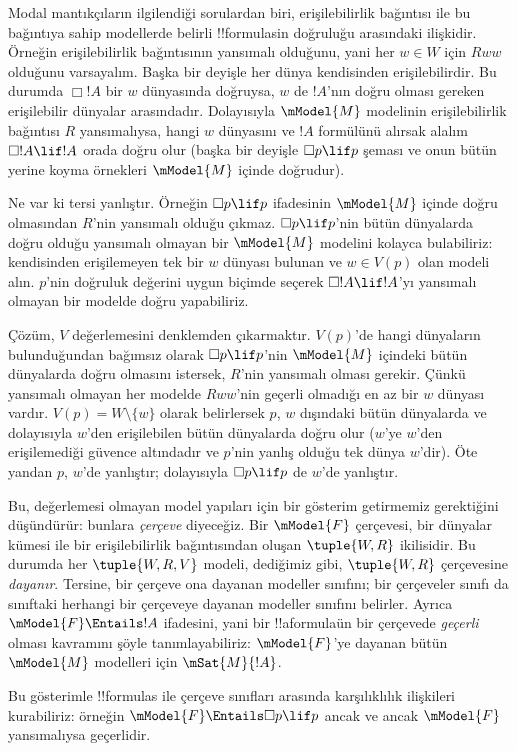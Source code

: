 \documentclass[../../../include/open-logic-section]{subfiles}
\begin{document}


Modal mantıkçıların ilgilendiği sorulardan biri, erişilebilirlik bağıntısı ile
bu bağıntıya sahip modellerde belirli !!{formula}s{}in doğruluğu arasındaki
ilişkidir. Örneğin erişilebilirlik bağıntısının yansımalı olduğunu, yani her
$w\in W$ için $Rww$ olduğunu varsayalım. Başka bir deyişle her dünya
kendisinden erişilebilirdir. Bu durumda $\Box !A$ bir $w$ dünyasında
doğruysa, $w$ de $!A$'nın doğru olması gereken erişilebilir dünyalar
arasındadır. Dolayısıyla $\mModel{M}$ modelinin erişilebilirlik bağıntısı $R$
yansımalıysa, hangi $w$ dünyasını ve $!A$ formülünü alırsak alalım $\Box !A
\lif !A$ orada doğru olur (başka bir deyişle $\Box p\lif p$ şeması ve onun
bütün yerine koyma örnekleri $\mModel{M}$ içinde doğrudur).

Ne var ki tersi yanlıştır. Örneğin $\Box p\lif p$ ifadesinin
$\mModel{M}$ içinde doğru olmasından $R$'nin yansımalı olduğu çıkmaz.
$\Box p\lif p$'nin bütün dünyalarda doğru olduğu yansımalı olmayan bir
$\mModel{M}$ modelini kolayca bulabiliriz: kendisinden erişilemeyen tek bir
$w$ dünyası bulunan ve $w\in V(p)$ olan modeli alın. $p$'nin doğruluk
değerini uygun biçimde seçerek $\Box !A\lif !A$'yı yansımalı olmayan bir
modelde doğru yapabiliriz.

Çözüm, $V$ değerlemesini denklemden çıkarmaktır. $V(p)$'de hangi
dünyaların bulunduğundan bağımsız olarak $\Box p\lif p$'nin
$\mModel{M}$ içindeki bütün dünyalarda doğru olmasını istersek, $R$'nin
yansımalı olması gerekir. Çünkü yansımalı olmayan her modelde $Rww$'nin
geçerli olmadığı en az bir $w$ dünyası vardır. $V(p)=W\setminus\{w\}$
olarak belirlersek $p$, $w$ dışındaki bütün dünyalarda ve dolayısıyla
$w$'den erişilebilen bütün dünyalarda doğru olur ($w$'ye $w$'den
erişilemediği güvence altındadır ve $p$'nin yanlış olduğu tek dünya $w$'dir).
Öte yandan $p$, $w$'de yanlıştır; dolayısıyla $\Box p\lif p$ de $w$'de
yanlıştır.

Bu, değerlemesi olmayan model yapıları için bir gösterim getirmemiz
gerektiğini düşündürür: bunlara \emph{çerçeve} diyeceğiz. Bir
$\mModel{F}$ çerçevesi, bir dünyalar kümesi ile bir erişilebilirlik
bağıntısından oluşan $\tuple{W,R}$ ikilisidir. Bu durumda her
$\tuple{W,R,V}$ modeli, dediğimiz gibi, $\tuple{W,R}$ çerçevesine
\emph{dayanır}. Tersine, bir çerçeve ona dayanan modeller sınıfını; bir
çerçeveler sınıfı da sınıftaki herhangi bir çerçeveye dayanan modeller
sınıfını belirler. Ayrıca $\mModel{F}\Entails !A$ ifadesini, yani bir
!!a{formula}{}ün bir çerçevede \emph{geçerli} olması kavramını şöyle
tanımlayabiliriz: $\mModel{F}$'ye dayanan bütün $\mModel{M}$ modelleri
için $\mSat{M}{!A}$.

Bu gösterimle !!{formula}s ile çerçeve sınıfları arasında karşılıklılık
ilişkileri kurabiliriz: örneğin $\mModel{F}\Entails\Box p\lif p$ ancak ve
ancak $\mModel{F}$ yansımalıysa geçerlidir.
\end{document}
